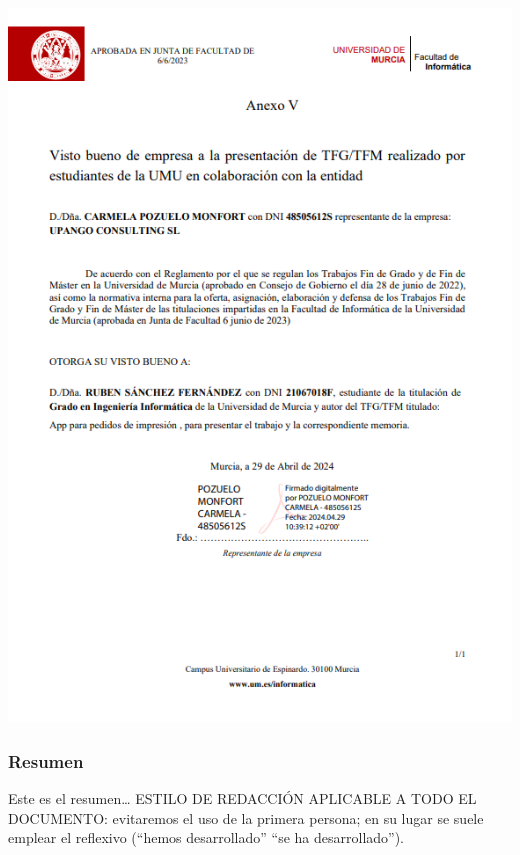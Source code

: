 \documentclass[12pt]{article}
\begin{document}
\pagestyle{empty}
\setcounter{page}{1}
\part*{}
\tableofcontents
\newpage
\listoffigures
\newpage
\clearpage
\pagestyle{fancy}

% 
\includegraphics[width=1\textwidth]{Anexo_Firmado_Upango.png}

\clearpage
\section{Resumen}
Este es el resumen…
ESTILO DE REDACCIÓN APLICABLE A TODO EL DOCUMENTO: evitaremos el uso de la primera persona; en su lugar se suele emplear el reflexivo (“hemos desarrollado” “se ha desarrollado”).
\end{document}
